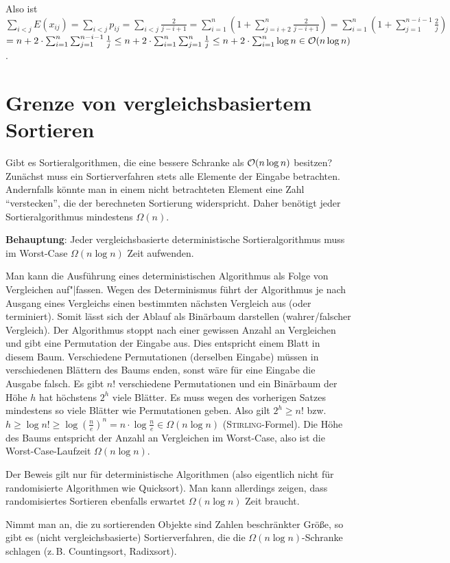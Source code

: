 \begin{Beweis}
    Also ist $\sum_{i < j} E(x_{ij}) = \sum_{i < j} p_{ij}
    = \sum_{i < j} \frac{2}{j - i + 1}
    = \sum_{i=1}^n (1 + \sum_{j=i+2}^n \frac{2}{j - i + 1})
    = \sum_{i=1}^n (1 + \sum_{j=1}^{n-i-1} \frac{2}{j})$ \\
    $= n + 2 \cdot \sum_{i=1}^n \sum_{j=1}^{n-i-1} \frac{1}{j}
    \le n + 2 \cdot \sum_{i=1}^n \sum_{j=1}^{n} \frac{1}{j}
    \le n + 2 \cdot \sum_{i=1}^n \log n \in \mathcal{O}(n \log n)$.
\end{Beweis}


\section{%
    Grenze von vergleichsbasiertem Sortieren%
}

Gibt es Sortieralgorithmen, die eine bessere Schranke als $\mathcal{O}(n \log n)$
besitzen?
Zunächst muss ein Sortierverfahren stets alle Elemente der Eingabe betrachten.
Andernfalls könnte man in einem nicht betrachteten Element eine Zahl
"`verstecken"', die der berechneten Sortierung widerspricht.
Daher benötigt jeder Sortieralgorithmus mindestens $\Omega(n)$.

\textbf{Behauptung}: Jeder vergleichsbasierte deterministische
Sortieralgorithmus muss im Worst-Case $\Omega(n \log n)$ Zeit aufwenden.

\begin{Beweis}
    Man kann die Ausführung eines deterministischen Algorithmus als Folge
    von Vergleichen auf"|fassen.
    Wegen des Determinismus führt der Algorithmus je nach Ausgang eines
    Vergleichs einen bestimmten nächsten Vergleich aus (oder terminiert).
    Somit lässt sich der Ablauf als Binärbaum darstellen (wahrer/falscher
    Vergleich).
    Der Algorithmus stoppt nach einer gewissen Anzahl an Vergleichen und gibt
    eine Permutation der Eingabe aus.
    Dies entspricht einem Blatt in diesem Baum.
    Verschiedene Permutationen (derselben Eingabe) müssen in verschiedenen
    Blättern des Baums enden, sonst wäre für eine Eingabe die Ausgabe falsch.
    Es gibt $n!$ verschiedene Permutationen und ein Binärbaum der Höhe $h$ hat
    höchstens $2^h$ viele Blätter.
    Es muss wegen des vorherigen Satzes mindestens so viele Blätter wie
    Permutationen geben.
    Also gilt $2^h \ge n!$ bzw.
    $h \ge \log n! \ge \log \left(\frac{n}{e}\right)^n
    = n \cdot \log \frac{n}{e} \in \Omega(n \log n)$
    (\textsc{Stirling}-Formel).
    Die Höhe des Baums entspricht der Anzahl an Vergleichen im Worst-Case, also
    ist die Worst-Case-Laufzeit $\Omega(n \log n)$.
\end{Beweis}

Der Beweis gilt nur für deterministische Algorithmen (also eigentlich nicht
für randomisierte Algorithmen wie Quicksort).
Man kann allerdings zeigen, dass randomisiertes Sortieren ebenfalls
erwartet $\Omega(n \log n)$ Zeit braucht.

Nimmt man an, die zu sortierenden Objekte sind Zahlen beschränkter Größe,
so gibt es (nicht vergleichsbasierte) Sortierverfahren, die die
$\Omega(n \log n)$-Schranke schlagen (z.\,B. Countingsort, Radixsort).

\pagebreak
